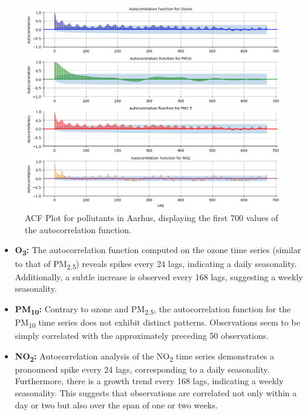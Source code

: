 \begin{figure}[h]
    \centering
    \includegraphics[width=1\linewidth]{images/acfplot_citypulse.png}
    \caption{ACF Plot for pollutants in Aarhus, displaying the first 700 values of the autocorrelation function.}
    \label{fig:acfplot_citypulse}
\end{figure}

\begin{itemize}
    \item \textbf{O\textsubscript{3}:}
    The autocorrelation function computed on the ozone time series (similar to that of PM\textsubscript{2.5}) reveals spikes every 24 lags, indicating a daily seasonality. Additionally, a subtle increase is observed every 168 lags, suggesting a weekly seasonality.
    \item \textbf{PM\textsubscript{10}:}
    Contrary to ozone and PM\textsubscript{2.5}, the autocorrelation function for the PM\textsubscript{10} time series does not exhibit distinct patterns. Observations seem to be simply correlated with the approximately preceding 50 observations.
    \item \textbf{NO\textsubscript{2}:}
    Autocorrelation analysis of the NO\textsubscript{2} time series demonstrates a pronounced spike every 24 lags, corresponding to a daily seasonality. Furthermore, there is a growth trend every 168 lags, indicating a weekly seasonality. This suggests that observations are correlated not only within a day or two but also over the span of one or two weeks.

\end{itemize}






